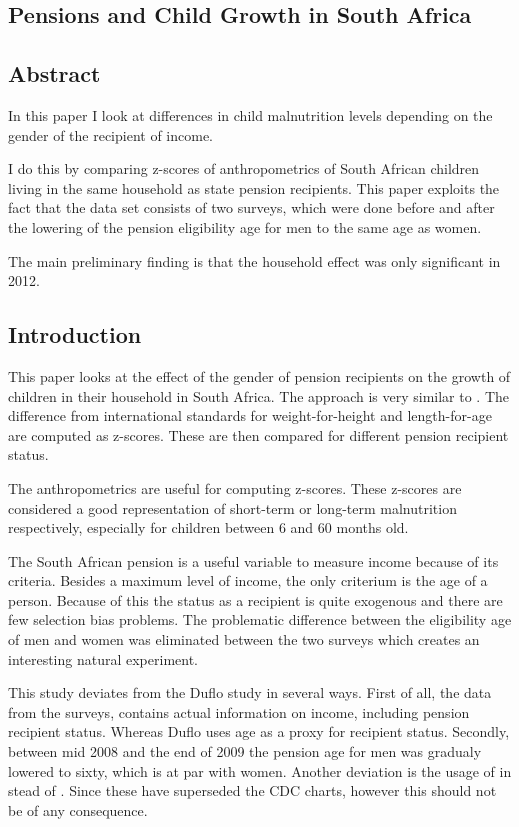 \documentclass[a4paper]{report}
\begin{document}
\begin{refsection}
\chapter{Pensions and Child Growth in South Africa}
\label{south-africa}
\section*{Abstract}
In this paper I look at differences in child malnutrition levels depending on the gender of the recipient of income.

I do this by comparing z-scores of anthropometrics of South African children living in the same household as state pension recipients.
This paper exploits the fact that the data set consists of two surveys,
which were done before and after the lowering of the pension eligibility age for men to the same age as women.

The main preliminary finding is that the household effect was only significant in 2012.

\section{Introduction}
This paper looks at the effect of the gender of pension recipients on the growth of children in their household in South Africa.
The approach is very similar to \textcite{duflo2000child,duflo2003grandmothers}.
The difference from international standards \parencite[WHO Child Growth Standards]{who2006child} for weight-for-height and length-for-age are computed as z-scores.
These are then compared for different pension recipient status.

The anthropometrics are useful for computing z-scores. These z-scores are considered a good representation of short-term or long-term malnutrition respectively, especially for children between 6 and 60 months old.

The South African pension is a useful variable to measure income because of its criteria.
Besides a maximum level of income, the only criterium is the age of a person.
Because of this the status as a recipient is quite exogenous and there are few selection bias problems.
The problematic difference between the eligibility age of men and women was eliminated between the two surveys which creates an interesting natural experiment.

This study deviates from the Duflo study in several ways.
First of all, the data from the \textcite{saldru2008nids,saldru2012nids} surveys, contains actual information on income, including pension recipient status.
Whereas Duflo uses age as a proxy for recipient status.
Secondly, between mid 2008 and the end of 2009 the pension age for men was gradualy lowered to sixty, which is at par with women.
Another deviation is the usage of \textcite[WHO Child Growth Standards]{who2006child} in stead of \textcite[CDC Growth Charts: United States]{nchs2000cdc}.
Since these have superseded the CDC charts, however this should not be of any consequence.


\end{refsection}
\end{document}
